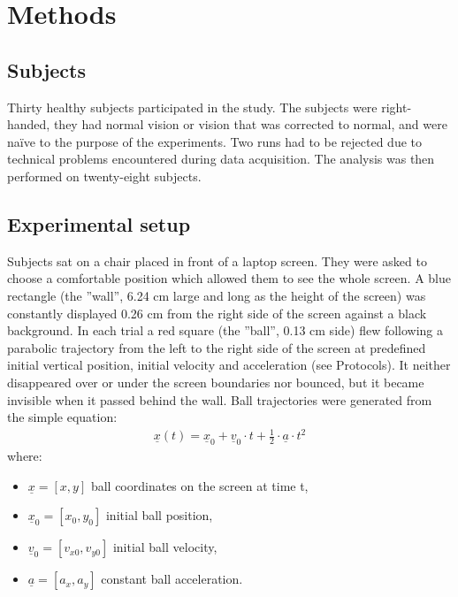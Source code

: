 \section{Methods} \label{Methods}

\subsection{Subjects}

Thirty healthy subjects 
participated in the study. The subjects were right-handed,
they had normal vision or vision that was corrected to normal, and were
na\"ive to the purpose of the experiments. Two runs had to be rejected due to technical problems encountered during data acquisition. The analysis was then performed on twenty-eight subjects.


\subsection{Experimental setup}

Subjects sat on a chair placed in front of a laptop screen. They were asked to 
choose a comfortable position which allowed them to see the whole screen. A blue rectangle
(the ''wall'', 6.24 cm large and long as the height of the screen) was constantly displayed 
0.26 cm from the right side of the screen against a black background. In each trial a red square (the ''ball'', 
0.13 cm side) flew following a parabolic trajectory from the left to the right side of the screen at predefined initial 
vertical position, initial velocity and acceleration (see Protocols). It neither disappeared over or under the screen boundaries nor bounced, but it became invisible when it passed behind the wall. Ball trajectories were generated from the simple equation:
\begin{eqnarray} \label{Eq:Trajectories}
\underline{x}(t) = \underline{x}_0 + \underline{v}_0 \cdot t +  \frac{1}{2} \cdot \underline{a} \cdot t^2
\end{eqnarray}
where:
\begin{itemize}
	\item $\underline{x} = \left[x, y\right]$ ball coordinates on the screen at time t,
	\item $\underline{x}_0 = \left[x_0, y_0\right]$ initial ball position,
	\item $\underline{v}_0 = \left[v_{x0}, v_{y0}\right]$ initial ball velocity,
	\item  $\underline{a} = \left[a_x, a_y\right]$ constant ball acceleration.
\end{itemize}

